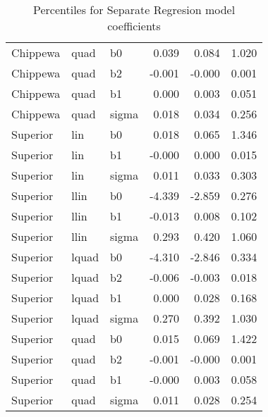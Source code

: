 \begin{table}[ht]
\begin{center}
\begin{tabular}{lllrrr}
  Chippewa & quad & b0 & 0.039 & 0.084 & 1.020 \\ 
  Chippewa & quad & b2 & -0.001 & -0.000 & 0.001 \\ 
  Chippewa & quad & b1 & 0.000 & 0.003 & 0.051 \\ 
  Chippewa & quad & sigma & 0.018 & 0.034 & 0.256 \\ 
  Superior & lin & b0 & 0.018 & 0.065 & 1.346 \\ 
  Superior & lin & b1 & -0.000 & 0.000 & 0.015 \\ 
  Superior & lin & sigma & 0.011 & 0.033 & 0.303 \\ 
  Superior & llin & b0 & -4.339 & -2.859 & 0.276 \\ 
  Superior & llin & b1 & -0.013 & 0.008 & 0.102 \\ 
  Superior & llin & sigma & 0.293 & 0.420 & 1.060 \\ 
  Superior & lquad & b0 & -4.310 & -2.846 & 0.334 \\ 
  Superior & lquad & b2 & -0.006 & -0.003 & 0.018 \\ 
  Superior & lquad & b1 & 0.000 & 0.028 & 0.168 \\ 
  Superior & lquad & sigma & 0.270 & 0.392 & 1.030 \\ 
  Superior & quad & b0 & 0.015 & 0.069 & 1.422 \\ 
  Superior & quad & b2 & -0.001 & -0.000 & 0.001 \\ 
  Superior & quad & b1 & -0.000 & 0.003 & 0.058 \\ 
  Superior & quad & sigma & 0.011 & 0.028 & 0.254 \\ 
   \hline
\end{tabular}
\caption{Percentiles for Separate Regresion model coefficients}
\end{center}
\end{table}
